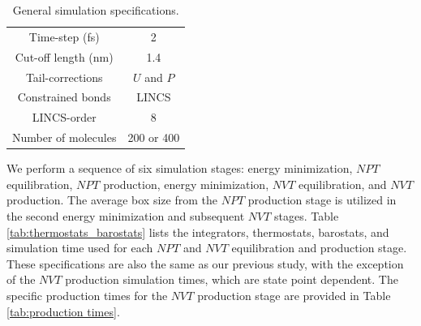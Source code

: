 \documentclass[preprint,review,12pt]{elsarticle}
\begin{document}
	\begin{table}[htb!]
		\caption{General simulation specifications.} \label{tab:sim_specs}
		\begin{center}
			\begin{tabular}{|c|c|}
				\hline
				Time-step (fs) & 2 \\
				Cut-off length (nm) & 1.4 \\
				Tail-corrections & $U$ and $P$ \\
				Constrained bonds & LINCS \cite{Hess1998,Hess2008} \\
				LINCS-order & 8 \\			     
				Number of molecules & 200 or 400 \\
				\hline        
			\end{tabular}
		\end{center}
	\end{table}

	We perform a sequence of six simulation stages: energy minimization, $NPT$ equilibration, $NPT$ production, energy minimization, $NVT$ equilibration, and $NVT$ production. The average box size from the $NPT$ production stage is utilized in the second energy minimization and subsequent $NVT$ stages. Table \ref{tab:thermostats_barostats} lists the integrators, thermostats, barostats, and simulation time used for each $NPT$ and $NVT$ equilibration and production stage. These specifications are also the same as our previous study, with the exception of the $NVT$ production simulation times, which are state point dependent. The specific production times for the $NVT$ production stage are provided in Table \ref{tab:production times}.

\end{document}
